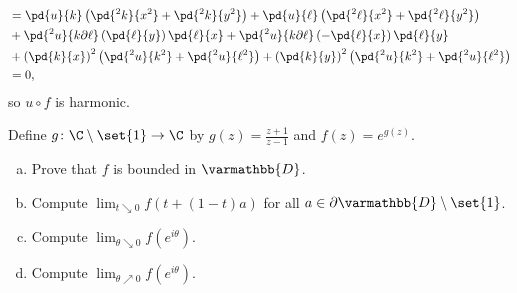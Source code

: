 \documentclass[10pt]{mypackage}
\renewcommand*{\mathbb}[1]{\varmathbb{#1}}
\begin{document}
\begin{solution}
\begin{align*}
                                  &= \pd{u}{k}\left( \pd{^2k}{x^2} + \pd{^2k}{y^2} \right) + \pd{u}{\ell}\left( \pd{^2\ell}{x^2} + \pd{^2\ell}{y^2} \right)\\
                                  &+ \pd{^2u}{k\partial \ell} \left( \pd{\ell}{y} \right)\pd{\ell}{x} + \pd{^2u}{k\partial \ell} \left( - \pd{\ell}{x} \right) \pd{\ell}{y}\\
                                  &+ \left( \pd{k}{x} \right)^2\left( \pd{^2u}{k^2}+ \pd{^2u}{\ell^2} \right) + \left( \pd{k}{y} \right)^2 \left( \pd{^2u}{k^2} + \pd{^2u}{\ell^2} \right)\\
                                  &= 0,
  \end{align*}
  so $u\circ f$ is harmonic.
\end{solution}
\begin{problem}[Problem 4]
  Define $g\colon \C\setminus \set{1}\rightarrow \C$ by $g(z) = \frac{z+1}{z-1}$ and $f(z) = e^{g(z)}$.
  \begin{enumerate}[(a)]
    \item Prove that $f$ is bounded in $ \mathbb{D} $.
    \item Compute $\lim_{t\searrow 0} f\left( t + \left( 1-t \right)a \right)$ for all $a\in \partial \mathbb{D}\setminus \set{1}$.
    \item Compute $\lim_{\theta\searrow 0} f\left( e^{i\theta} \right)$.
    \item Compute $\lim_{\theta \nearrow 0} f\left( e^{i\theta} \right)$.
  \end{enumerate}
\end{problem}
\end{document}
